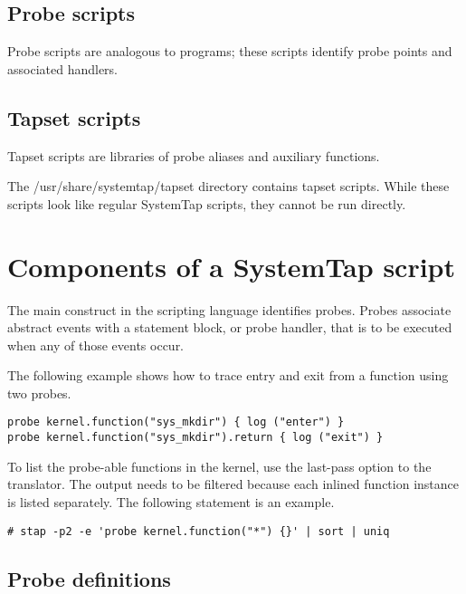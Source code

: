 \documentclass[twoside,english]{article}
\newenvironment{vindent}
{\begin{list}{}{\setlength{\listparindent}{6pt}}
\item[]}
{\end{list}}
\begin{document}
\subsection{Probe scripts}

Probe scripts are analogous to programs; these scripts identify probe points
and associated handlers.

\subsection{Tapset scripts}

Tapset scripts are libraries of probe aliases and auxiliary functions.

The /usr/share/systemtap/tapset directory contains tapset scripts. While
these scripts look like regular SystemTap scripts, they cannot be run directly.

\section{Components of a SystemTap script}

The main construct in the scripting language identifies probes. Probes associate
abstract events with a statement block, or probe handler, that is to be executed
when any of those events occur.

The following example shows how to trace entry and exit from a function using
two probes.

\begin{vindent}
\begin{verbatim}
probe kernel.function("sys_mkdir") { log ("enter") }
probe kernel.function("sys_mkdir").return { log ("exit") }
\end{verbatim}
\end{vindent}

To list the probe-able functions in the kernel, use the last-pass option
to the translator. The output needs to be filtered because each inlined function
instance is listed separately. The following statement is an example.

\begin{vindent}
\begin{verbatim}
# stap -p2 -e 'probe kernel.function("*") {}' | sort | uniq
\end{verbatim}
\end{vindent}

\subsection{Probe definitions}
\end{document}
